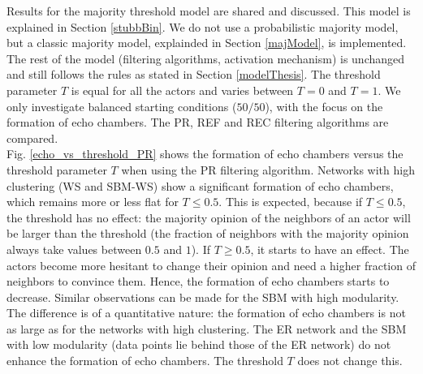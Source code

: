 \documentclass[11 pt , letterpaper , twoside , openright]{book}
\begin{document}
Results for the majority threshold model are shared and discussed. This model is explained in Section \ref{stubbBin}. We do not use a probabilistic majority model, but a classic majority model, explainded in Section \ref{majModel}, is implemented. The rest of the model (filtering algorithms, activation mechanism) is unchanged and still follows the rules as stated in Section \ref{modelThesis}. The threshold parameter $T$ is equal for all the actors and varies between $T=0$ and $T=1$. We only investigate balanced starting conditions ($50/50$), with the focus on the formation of echo chambers. The PR, REF and REC filtering algorithms are compared. \\
\newline
Fig. \ref{echo_vs_threshold_PR} shows the formation of echo chambers versus the threshold parameter $T$ when using the PR filtering algorithm. Networks with high clustering (WS and SBM-WS) show a significant formation of echo chambers, which remains more or less flat for $T \leqslant 0.5$. This is expected, because if $T \leqslant 0.5$, the threshold has no effect: the majority opinion of the neighbors of an actor will be larger than the threshold (the fraction of neighbors with the majority opinion always take values between $0.5$ and $1$). If $T \geqslant 0.5$, it starts to have an effect. The actors become more hesitant to change their opinion and need a higher fraction of neighbors to convince them. Hence, the formation of echo chambers starts to decrease. Similar observations can be made for the SBM with high modularity. The difference is of a quantitative nature: the formation of echo chambers is not as large as for the networks with high clustering. The ER network and the SBM with low modularity (data points lie behind those of the ER network) do not enhance the formation of echo chambers. The threshold $T$ does not change this. 
\end{document}
